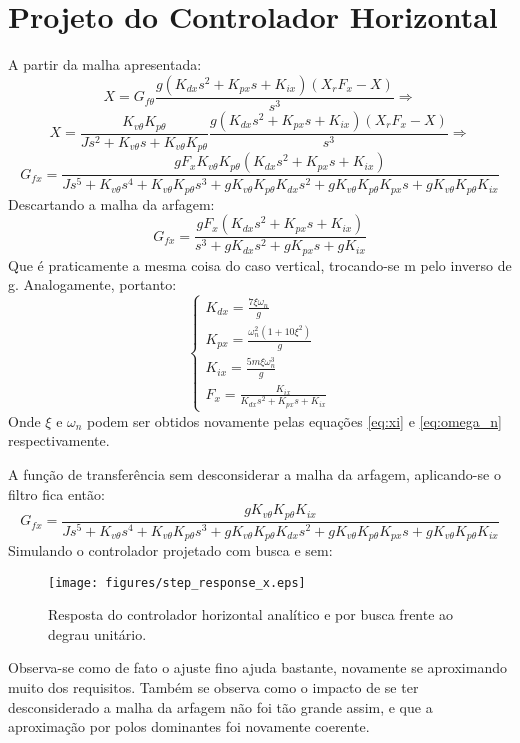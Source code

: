 \documentclass[a4paper]{article}
\begin{document}
	\section{Projeto do Controlador Horizontal}
	A partir da malha apresentada:
	\begin{equation}
		X = G_{f\theta}\frac{g(K_{dx}s^2 + K_{px}s + K_{ix})(X_rF_x - X)}{s^3} \Rightarrow
		\nonumber
	\end{equation}
	\begin{equation}
		X = \frac{K_{v\theta}K_{p\theta}}{Js^2 + K_{v\theta}s + K_{v\theta}K_{p\theta}}
		\frac{g(K_{dx}s^2 + K_{px}s + K_{ix})(X_rF_x - X)}{s^3} \Rightarrow
		\nonumber
	\end{equation}
	\begin{equation}
		G_{fx} = \frac{gF_xK_{v\theta}K_{p\theta}(K_{dx}s^2 + K_{px}s + K_{ix})}
		{Js^5 + K_{v\theta}s^4 + K_{v\theta}K_{p\theta}s^3 + gK_{v\theta}
		K_{p\theta}K_{dx}s^2 + gK_{v\theta}K_{p\theta}K_{px}s + gK_{v\theta}K_{p\theta}K_{ix}}
		\nonumber
	\end{equation}
	Descartando a malha da arfagem:
	\begin{equation}
		G_{fx} = \frac{gF_x(K_{dx}s^2 + K_{px}s + K_{ix})}{s^3 + gK_{dx}s^2 + gK_{px}s + gK_{ix}}
		\nonumber
	\end{equation}
	Que \'e praticamente a mesma coisa do caso vertical, trocando-se m pelo inverso de g.
	Analogamente, portanto:
	\begin{equation}
		\left\{\begin{array}{l}
			K_{dx} = \frac{7\xi\omega_n}{g}\\
			K_{px} = \frac{\omega_n^2(1 + 10\xi^2)}{g}\\
			K_{ix} = \frac{5m\xi\omega_n^3}{g}\\
			F_x = \frac{K_{ix}}{K_{dx}s^2 + K_{px}s + K_{ix}}
		\end{array}\right.
		\nonumber
	\end{equation}
	Onde $\xi$ e $\omega_n$ podem ser obtidos novamente pelas equa\c{c}\~oes \ref{eq:xi} e
	\ref{eq:omega_n} respectivamente.
	
	A fun\c{c}\~ao de transfer\^encia sem desconsiderar a malha da arfagem, aplicando-se
	o filtro fica ent\~ao:
	\begin{equation}
		G_{fx} = \frac{gK_{v\theta}K_{p\theta}K_{ix}}
		{Js^5 + K_{v\theta}s^4 + K_{v\theta}K_{p\theta}s^3 + gK_{v\theta}
		K_{p\theta}K_{dx}s^2 + gK_{v\theta}K_{p\theta}K_{px}s + gK_{v\theta}K_{p\theta}K_{ix}}
		\nonumber
	\end{equation}
	Simulando o controlador projetado com busca e sem:
	\begin{figure}[H]
		\centering
		\texttt{[image: figures/step\_response\_x.eps]}
		\caption{Resposta do controlador horizontal anal\'itico e por busca frente ao degrau
		unit\'ario.}
	\end{figure}
	Observa-se como de fato o ajuste fino ajuda bastante, novamente se aproximando muito
	dos requisitos. Tamb\'em se observa como o impacto de se ter desconsiderado a malha da
	arfagem n\~ao foi t\~ao grande assim, e que a aproxima\c{c}\~ao por polos dominantes foi
	novamente coerente.
\end{document}
